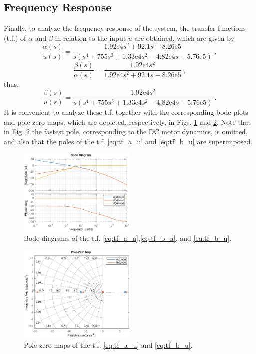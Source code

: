 \documentclass[letterpaper, 10 pt, conference]{ieeeconf}
\begin{document}
\subsection{Frequency Response}\label{sec:freq_resp}
Finally, to analyze the frequency response of the system, the transfer functions (t.f.) of $\alpha$ and $\beta$ in relation to the input $u$ are obtained, which are given by 
\begin{equation}\label{eq:tf_a_u}
   \frac{\alpha(s)}{u(s)} = \frac{1.92\text{e}4 s^2 + 92.1 s - 8.26\text{e}5}{s(s^4 + 755 s^3 + 1.33\text{e}4 s^2 - 4.82\text{e}4 s - 5.76\text{e}5)}\:,
\end{equation}
\begin{equation}\label{eq:tf_b_a}
   \frac{\beta(s)}{\alpha(s)} = \frac{1.92\text{e}4 s^2}{1.92\text{e}4 s^2 + 92.1s - 8.26\text{e}5}\:,
\end{equation}
thus,
\begin{equation}\label{eq:tf_b_u}
   \frac{\beta(s)}{u(s)} = \frac{1.92\text{e}4 s^2}{s(s^4 + 755 s^3 + 1.33\text{e}4 s^2 - 4.82\text{e}4 s - 5.76\text{e}5)}\:.
\end{equation}
It is convenient to analyze these t.f. together with the corresponding bode plots and pole-zero maps, which are depicted, respectively, in Figs. \ref{fig:bode_all} and \ref{fig:pz_all}. Note that in Fig. \ref{fig:pz_all} the fastest pole, corresponding to the DC motor dynamics, is omitted, and also that the poles of the t.f. \eqref{eq:tf_a_u} and \eqref{eq:tf_b_u} are superimposed.
\begin{figure}[h]
\vspace{-0.4cm}
    \centering
    \includegraphics[width = 0.5\textwidth]{figures/bode_all.eps}
    \caption{Bode diagrams of the t.f. \eqref{eq:tf_a_u},\eqref{eq:tf_b_a}, and \eqref{eq:tf_b_u}.}
    \label{fig:bode_all}
\end{figure}
\begin{figure}[h]
\vspace{-0.4cm}
    \centering
    \includegraphics[width = 0.5\textwidth]{figures/pz_all.eps}
    \caption{Pole-zero maps of the t.f. \eqref{eq:tf_a_u} and \eqref{eq:tf_b_u}.}
    \label{fig:pz_all}
\end{figure}
\end{document}
